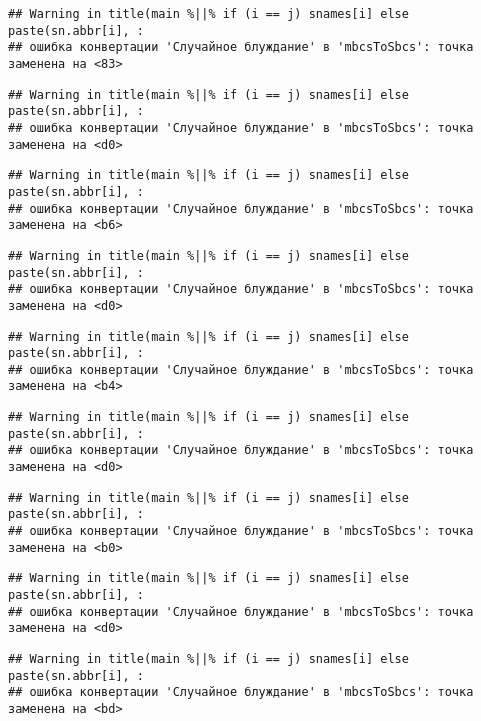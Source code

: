 \documentclass[
]{article}
\begin{document}
\begin{verbatim}
## Warning in title(main %||% if (i == j) snames[i] else paste(sn.abbr[i], :
## ошибка конвертации 'Случайное блуждание' в 'mbcsToSbcs': точка заменена на <83>
\end{verbatim}

\begin{verbatim}
## Warning in title(main %||% if (i == j) snames[i] else paste(sn.abbr[i], :
## ошибка конвертации 'Случайное блуждание' в 'mbcsToSbcs': точка заменена на <d0>
\end{verbatim}

\begin{verbatim}
## Warning in title(main %||% if (i == j) snames[i] else paste(sn.abbr[i], :
## ошибка конвертации 'Случайное блуждание' в 'mbcsToSbcs': точка заменена на <b6>
\end{verbatim}

\begin{verbatim}
## Warning in title(main %||% if (i == j) snames[i] else paste(sn.abbr[i], :
## ошибка конвертации 'Случайное блуждание' в 'mbcsToSbcs': точка заменена на <d0>
\end{verbatim}

\begin{verbatim}
## Warning in title(main %||% if (i == j) snames[i] else paste(sn.abbr[i], :
## ошибка конвертации 'Случайное блуждание' в 'mbcsToSbcs': точка заменена на <b4>
\end{verbatim}

\begin{verbatim}
## Warning in title(main %||% if (i == j) snames[i] else paste(sn.abbr[i], :
## ошибка конвертации 'Случайное блуждание' в 'mbcsToSbcs': точка заменена на <d0>
\end{verbatim}

\begin{verbatim}
## Warning in title(main %||% if (i == j) snames[i] else paste(sn.abbr[i], :
## ошибка конвертации 'Случайное блуждание' в 'mbcsToSbcs': точка заменена на <b0>
\end{verbatim}

\begin{verbatim}
## Warning in title(main %||% if (i == j) snames[i] else paste(sn.abbr[i], :
## ошибка конвертации 'Случайное блуждание' в 'mbcsToSbcs': точка заменена на <d0>
\end{verbatim}

\begin{verbatim}
## Warning in title(main %||% if (i == j) snames[i] else paste(sn.abbr[i], :
## ошибка конвертации 'Случайное блуждание' в 'mbcsToSbcs': точка заменена на <bd>
\end{verbatim}
\end{document}
